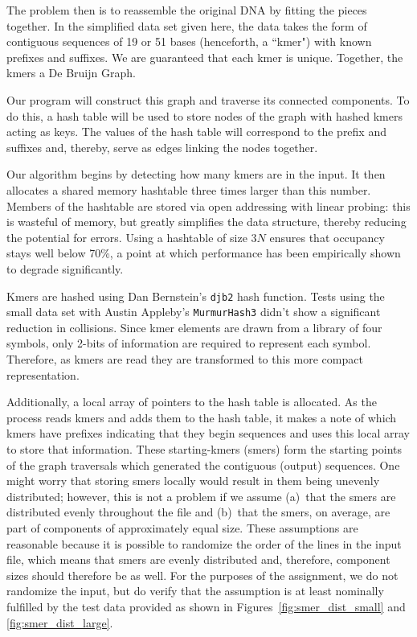 \documentclass{article}
\begin{document}
The problem then is to reassemble the original DNA by fitting the pieces together. In the simplified data set given here, the data takes the form of contiguous sequences of 19 or 51 bases (henceforth, a ``kmer") with known prefixes and suffixes. We are guaranteed that each kmer is unique. Together, the kmers a De Bruijn Graph.

Our program will construct this graph and traverse its connected components. To do this, a hash table will be used to store nodes of the graph with hashed kmers acting as keys. The values of the hash table will correspond to the prefix and suffixes and, thereby, serve as edges linking the nodes together.

Our algorithm begins by detecting how many kmers are in the input. It then allocates a shared memory hashtable three times larger than this number. Members of the hashtable are stored via open addressing with linear probing: this is wasteful of memory, but greatly simplifies the data structure, thereby reducing the potential for errors. Using a hashtable of size $3N$ ensures that occupancy stays well below 70\%, a point at which performance has been empirically shown to degrade significantly.

Kmers are hashed using Dan Bernstein's \texttt{djb2} hash function. Tests using the small data set with Austin Appleby's \texttt{MurmurHash3} didn't show a significant reduction in collisions. Since kmer elements are drawn from a library of four symbols, only 2-bits of information are required to represent each symbol. Therefore, as kmers are read they are transformed to this more compact representation.

Additionally, a local array of pointers to the hash table is allocated. As the process reads kmers and adds them to the hash table, it makes a note of which kmers have prefixes indicating that they begin sequences and uses this local array to store that information. These starting-kmers (smers) form the starting points of the graph traversals which generated the contiguous (output) sequences. One might worry that storing smers locally would result in them being unevenly distributed; however, this is not a problem if we assume (a)~that the smers are distributed evenly throughout the file and (b)~that the smers, on average, are part of components of approximately equal size. These assumptions are reasonable because it is possible to randomize the order of the lines in the input file, which means that smers are evenly distributed and, therefore, component sizes should therefore be as well. For the purposes of the assignment, we do not randomize the input, but do verify that the assumption is at least nominally fulfilled by the test data provided as shown in Figures~\ref{fig:smer_dist_small} and \ref{fig:smer_dist_large}.
\end{document}
